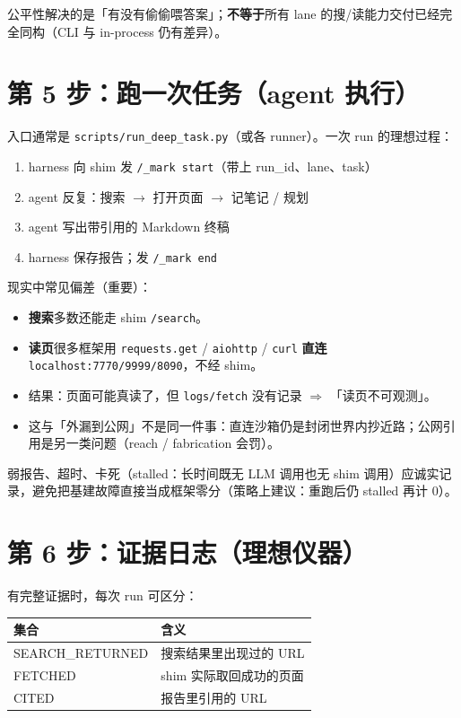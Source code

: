 \documentclass[11pt,a4paper]{article}
\begin{document}
公平性解决的是「有没有偷偷喂答案」；\textbf{不等于}所有 lane 的搜/读能力交付已经完全同构（CLI 与 in-process 仍有差异）。

\section{第 5 步：跑一次任务（agent 执行）}

入口通常是 \texttt{scripts/run\_deep\_task.py}（或各 runner）。一次 run 的理想过程：

\begin{enumerate}[leftmargin=1.8em]
  \item harness 向 shim 发 \texttt{/\_mark start}（带上 run\_id、lane、task）
  \item agent 反复：搜索 $\rightarrow$ 打开页面 $\rightarrow$ 记笔记 / 规划
  \item agent 写出带引用的 Markdown 终稿
  \item harness 保存报告；发 \texttt{/\_mark end}
\end{enumerate}

现实中常见偏差（重要）：
\begin{itemize}[leftmargin=1.5em]
  \item \textbf{搜索}多数还能走 shim \texttt{/search}。
  \item \textbf{读页}很多框架用 \texttt{requests.get} / \texttt{aiohttp} / \texttt{curl} \textbf{直连} \texttt{localhost:7770/9999/8090}，不经 shim。
  \item 结果：页面可能真读了，但 \texttt{logs/fetch} 没有记录 $\Rightarrow$ 「读页不可观测」。
  \item 这与「外漏到公网」不是同一件事：直连沙箱仍是封闭世界内抄近路；公网引用是另一类问题（reach / fabrication 会罚）。
\end{itemize}

弱报告、超时、卡死（stalled：长时间既无 LLM 调用也无 shim 调用）应诚实记录，避免把基建故障直接当成框架零分（策略上建议：重跑后仍 stalled 再计 0）。

\section{第 6 步：证据日志（理想仪器）}

有完整证据时，每次 run 可区分：

\begin{center}
\begin{tabular}{@{}lp{9cm}@{}}
\toprule
集合 & 含义 \\
\midrule
SEARCH\_RETURNED & 搜索结果里出现过的 URL \\
FETCHED & shim 实际取回成功的页面 \\
CITED & 报告里引用的 URL \\
\bottomrule
\end{tabular}
\end{center}
\end{document}
